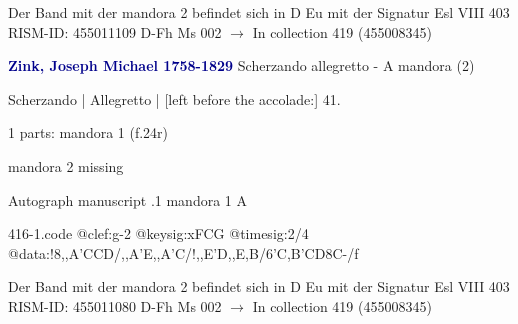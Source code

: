 \documentclass[twocolumn]{book}
\begin{document}
\newline Der Band mit der mandora 2 befindet sich in D Eu mit der Signatur Esl VIII 403
\newline RISM-ID: 455011109
\newline D-Fh  Ms 002
\newline $\rightarrow$ In collection 419 (455008345)
      
\newline \par \vspace{7pt} \textcolor{darkblue}{\textbf{Zink, Joseph Michael  1758-1829}}
\newline Scherzando allegretto - A
\newline mandora (2)
\newline \begin{itshape}[f.24r, at left:] Scherzando | Allegretto | [left before the accolade:] 41.\end{itshape} 
\newline \textcolor{darkblue}{}  1 parts: mandora 1  (f.24r)
\newline \begin{small} mandora 2 missing\end{small} 
\newline Autograph manuscript
.1  mandora 1  A  
\begin{filecontents*}{416-1.code}
@clef:g-2
@keysig:xFCG
@timesig:2/4
@data:!8,,A'CCD/,,A'E,,A'C/!,,E'D,,E,B/{6'C,B'CD}8C-/f
\end{filecontents*}
\newline
%

\newline Der Band mit der mandora 2 befindet sich in D Eu mit der Signatur Esl VIII 403
\newline RISM-ID: 455011080
\newline D-Fh  Ms 002
\newline $\rightarrow$ In collection 419 (455008345)
      
\end{document}
